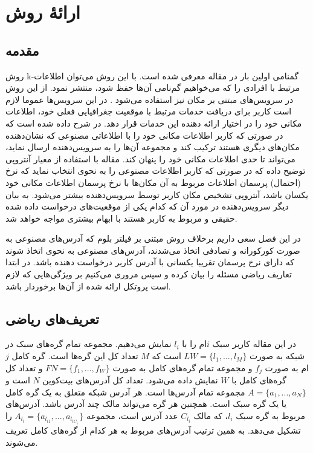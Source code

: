 \chapter{ارائهٔ روش}
\label{proposed}
\section{مقدمه} 
روش k-گمنامی اولین بار در مقاله \cite{Sweeney2002} معرفی شده است. با این روش می‌توان اطلاعات مرتبط با افرادی  را که می‌خواهیم گم‌نامی آن‌ها حفظ شود، منتشر نمود. از این روش در سرویس‌های مبتنی بر مکان نیز استفاده می‌شود \cite{Niu2015} . در این سرویس‌ها عموما لازم است کاربر برای دریافت خدمات مرتبط با موقعیت جغرافیایی فعلی خود، اطلاعات مکانی خود را در اختیار ارائه دهنده این خدمات قرار دهد. در  \cite{Niu2015} شرح داده شده است که در صورتی که کاربر اطلاعات مکانی خود را با اطلاعاتی مصنوعی که نشان‌دهنده مکان‌های دیگری هستند ترکیب کند و مجموعه آن‌ها را به سرویس‌دهنده ارسال نماید، می‌تواند تا حدی اطلاعات مکانی خود را پنهان کند. مقاله \cite{Niu2015} با استفاده از معیار آنتروپی توضیح داده که در صورتی که کاربر اطلاعات مصنوعی را به نحوی انتخاب نماید که نرخ (احتمال) پرسمان اطلاعات مربوط به آن مکان‌ها با نرخ پرسمان اطلاعات مکانی خود یکسان باشد، آنتروپی تشخیص مکان کاربر توسط سرویس‌دهنده بیشتر می‌شود. به بیان دیگر سرویس‌دهنده در مورد آن که کدام یکی از موقعیت‌های درخواست داده شده حقیقی و مربوط به کاربر هستند با ابهام بیشتری مواجه خواهد شد.

در این فصل سعی داریم برخلاف روش مبتنی بر فیلتر بلوم که آدرس‌های مصنوعی به صورت کورکورانه و تصادفی اتخاذ می‌شدند، آدرس‌های مصنوعی به نحوی اتخاذ شوند که دارای نرخ پرسمان تقریبا یکسانی با آدرس کاربر درخواست دهنده باشد. در ابتدا تعاریف ریاضی مسئله را بیان کرده و سپس مروری می‌کنیم بر ویژگی‌هایی که لازم است پروتکل ارائه شده از آن‌ها برخوردار باشد.



\section{تعریف‌های ریاضی}

در این مقاله کاربر سبک $i$ام را با $l_i$ نمایش می‌دهیم. مجموعه تمام گره‌های سبک در شبکه به صورت $LW = \{l_1,..., l_M\}$ است که $M$ تعداد کل این گره‌ها است. گره‌ کامل $j$ام به صورت $f_j$ و مجموعه تمام گره‌های کامل به صورت $FN=\{f_1,..., f_W\}$ و تعداد کل گره‌های کامل با $W$ نمایش داده می‌شود. تعداد کل آدرس‌های بیت‌کوین $N$ است و $A=\{a_1,..., a_N\}$ مجموعه تمام آدرس‌ها است. هر آدرس شبکه متعلق به یک گره کامل یا یک گره سبک است. همچنین هر گره می‌تواند مالک چند آدرس باشد. آدرس‌های مربوط به گره سبک $l_i$، که مالک
$C_{l_i}$ 
عدد آدرس است، مجموعه 
$A_{l_i}=\{a_{l_{i1}},... , a_{l_{iC_{l_i}}}\}$
را تشکیل می‌دهد. به همین ترتیب آدرس‌های مربوط به هر کدام از گره‌های کامل تعریف می‌شوند.

